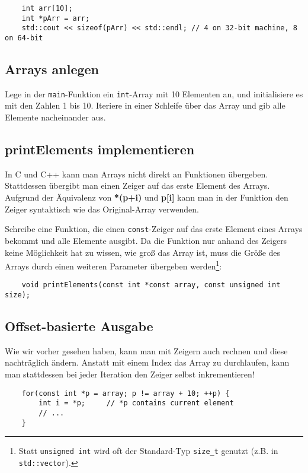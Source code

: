 \begin{lstlisting}
	int arr[10];
	int *pArr = arr;
	std::cout << sizeof(pArr) << std::endl; // 4 on 32-bit machine, 8 on 64-bit
\end{lstlisting}

\subsection{Arrays anlegen}
Lege in der \texttt{main}-Funktion ein \texttt{int}-Array mit 10 Elementen an, und initialisiere es mit den Zahlen 1 bis 10.
Iteriere in einer Schleife über das Array und gib alle Elemente nacheinander aus.

\subsection{printElements implementieren}
In C und C++ kann man Arrays nicht direkt an Funktionen übergeben.
Stattdessen übergibt man einen Zeiger auf das erste Element des Arrays. Aufgrund der Äquivalenz von \textbf{*(p+i) } und \textbf{p[i]} kann man in der Funktion den Zeiger syntaktisch wie das Original-Array verwenden.

Schreibe eine Funktion, die einen \texttt{const}-Zeiger auf das erste Element eines Arrays bekommt und alle Elemente ausgibt.
Da die Funktion nur anhand des Zeigers keine Möglichkeit hat zu wissen, wie groß das Array ist, muss die Größe des Arrays durch einen weiteren Parameter übergeben werden\footnote{Statt \texttt{unsigned int} wird oft der Standard-Typ \texttt{size\_t} genutzt (z.B. in \texttt{std::vector}).}:

\begin{lstlisting}
	void printElements(const int *const array, const unsigned int size);
\end{lstlisting}

\subsection{Offset-basierte Ausgabe}
Wie wir vorher gesehen haben, kann man mit Zeigern auch rechnen und diese nachträglich ändern.
Anstatt mit einem Index das Array zu durchlaufen, kann man stattdessen bei jeder Iteration den Zeiger selbst inkrementieren!

\begin{lstlisting}
	for(const int *p = array; p != array + 10; ++p) {
		int i = *p;		// *p contains current element
		// ...
	}
\end{lstlisting}

